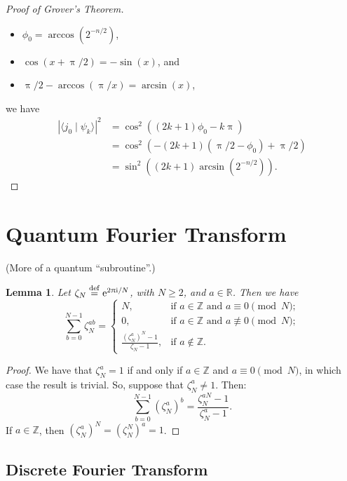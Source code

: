 \documentclass[12pt]{amsart}
\theoremstyle{plain}
\newtheorem{lemma}[theorem]{Lemma}
\theoremstyle{definition}
\theoremstyle{remark}
\newcommand{\R}{\mathbb{R}}
\newcommand{\Z}{\mathbb{Z}}
\newcommand{\me}{\mathrm{e}}
\newcommand{\mi}{\mathrm{i}}
\newcommand{\mpi}{\uppi}
\newcommand{\idef}{\overset{{\rm def}}{=}}
\newcommand{\abs}[1]{\left| #1 \right|}
\begin{document}
\begin{proof}[Proof of Grover's Theorem]
\begin{itemize}
  \item $\phi_0 = \arccos(2^{-n/2})$,

  \item $\cos(x + \mpi/2) = -\sin(x)$, and

  \item $\mpi/2 - \arccos(\mpi/x) = \arcsin(x)$,

  \end{itemize}
  we have
  \begin{align*}
    \abs{\langle j_0 \mid \psi_k \rangle}^2
    &= \cos^2((2k+1)\phi_0 - k\mpi) \\
    &=\cos^2(-(2k+1)(\mpi/2 - \phi_0) + \mpi/2) \\
    &= \sin^2((2k+1) \arcsin(2^{-n/2})).
  \end{align*}


\end{proof}


\section{Quantum Fourier Transform}


(More of a quantum ``subroutine''.)


\begin{lemma}\label{lemma:expsum}
  Let $\zeta_N \idef \me^{2 \mpi \mi/N}$, with $N \geq 2$, and $a \in \R$.  Then we have
  \[
    \sum_{b=0}^{N-1} \zeta_N^{ab} =
    \begin{cases}
      N, & \text{if $a \in \Z$ and $a \equiv 0 \pmod{N}$}; \\
      0, & \text{if $a \in \Z$ and $a \not\equiv 0 \pmod{N}$}; \\
      \frac{{\left(\zeta_N^{a}\right)}^N - 1}{\zeta_N - 1}, & \text{if $a \not\in \Z$}.
    \end{cases}
  \]
\end{lemma}

\begin{proof}
  We have that $\zeta_N^a = 1$ if and only if $a \in \Z$ and $a \equiv 0 \pmod{N}$, in which case the result is trivial.  So, suppose that $\zeta_N^a \neq 1$.  Then:
  \[
    \sum_{b=0}^{N-1} {\left(\zeta_N^a\right)}^b = \frac{\zeta_N^{aN} - 1}{\zeta_N^a - 1}.
  \]
  If $a \in \Z$, then ${\left( \zeta_N^a \right)}^N = {\left( \zeta_N^N \right)}^a = 1$.
\end{proof}


\subsection{Discrete Fourier Transform}
\end{document}
